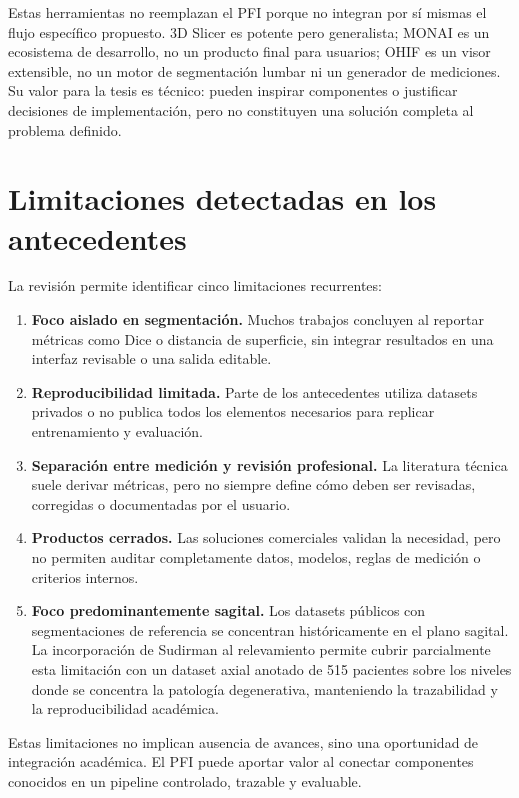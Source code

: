 Estas herramientas no reemplazan el PFI porque no integran por sí mismas el flujo específico propuesto. 3D Slicer es potente pero generalista; MONAI es un ecosistema de desarrollo, no un producto final para usuarios; OHIF es un visor extensible, no un motor de segmentación lumbar ni un generador de mediciones. Su valor para la tesis es técnico: pueden inspirar componentes o justificar decisiones de implementación, pero no constituyen una solución completa al problema definido.


\section{Limitaciones detectadas en los antecedentes}

La revisión permite identificar cinco limitaciones recurrentes:

\begin{enumerate}
    \item \textbf{Foco aislado en segmentación.} Muchos trabajos concluyen al reportar métricas como Dice o distancia de superficie, sin integrar resultados en una interfaz revisable o una salida editable.
    \item \textbf{Reproducibilidad limitada.} Parte de los antecedentes utiliza datasets privados o no publica todos los elementos necesarios para replicar entrenamiento y evaluación.
    \item \textbf{Separación entre medición y revisión profesional.} La literatura técnica suele derivar métricas, pero no siempre define cómo deben ser revisadas, corregidas o documentadas por el usuario.
    \item \textbf{Productos cerrados.} Las soluciones comerciales validan la necesidad, pero no permiten auditar completamente datos, modelos, reglas de medición o criterios internos.
    \item \textbf{Foco predominantemente sagital.} Los datasets públicos con segmentaciones de referencia se concentran históricamente en el plano sagital. La incorporación de Sudirman al relevamiento permite cubrir parcialmente esta limitación con un dataset axial anotado de 515 pacientes sobre los niveles donde se concentra la patología degenerativa, manteniendo la trazabilidad y la reproducibilidad académica.
\end{enumerate}

Estas limitaciones no implican ausencia de avances, sino una oportunidad de integración académica. El PFI puede aportar valor al conectar componentes conocidos en un pipeline controlado, trazable y evaluable.

